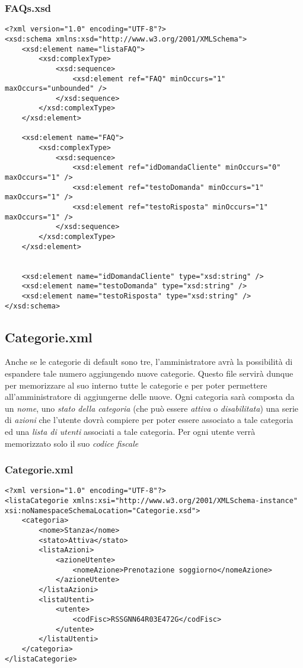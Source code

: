 \documentclass [a4paper, 12pt]{book}
\begin{document}
\subsubsection{FAQs.xsd}
\begin{lstlisting}[style=XML]
<?xml version="1.0" encoding="UTF-8"?>
<xsd:schema xmlns:xsd="http://www.w3.org/2001/XMLSchema">
    <xsd:element name="listaFAQ">
        <xsd:complexType>
            <xsd:sequence>
                <xsd:element ref="FAQ" minOccurs="1" maxOccurs="unbounded" />
            </xsd:sequence>
        </xsd:complexType>
    </xsd:element>

    <xsd:element name="FAQ">
        <xsd:complexType>
            <xsd:sequence>
                <xsd:element ref="idDomandaCliente" minOccurs="0" maxOccurs="1" />
                <xsd:element ref="testoDomanda" minOccurs="1" maxOccurs="1" />
                <xsd:element ref="testoRisposta" minOccurs="1" maxOccurs="1" />
            </xsd:sequence>
        </xsd:complexType>
    </xsd:element>


    <xsd:element name="idDomandaCliente" type="xsd:string" />
    <xsd:element name="testoDomanda" type="xsd:string" />
    <xsd:element name="testoRisposta" type="xsd:string" />
</xsd:schema>
\end{lstlisting}

\subsection{Categorie.xml}
Anche se le categorie di default sono tre, l'amministratore avrà la possibilità di espandere tale numero aggiungendo nuove categorie. Questo file servirà dunque per memorizzare al suo interno tutte le categorie e per poter permettere all'amministratore di aggiungerne delle nuove. Ogni categoria sarà composta da un \textit{nome}, uno \textit{stato della categoria} (che può essere \textit{attiva} o \textit{disabilitata}) una serie di \textit{azioni} che l'utente dovrà compiere per poter essere associato a  tale categoria ed una \textit{lista di utenti} associati a tale categoria. Per ogni utente verrà memorizzato solo il suo \textit{codice fiscale}

\subsubsection{Categorie.xml}
\begin{lstlisting}[style=XML]
<?xml version="1.0" encoding="UTF-8"?>
<listaCategorie xmlns:xsi="http://www.w3.org/2001/XMLSchema-instance" xsi:noNamespaceSchemaLocation="Categorie.xsd">
    <categoria>
        <nome>Stanza</nome>
        <stato>Attiva</stato>
        <listaAzioni>
            <azioneUtente>
                <nomeAzione>Prenotazione soggiorno</nomeAzione>
            </azioneUtente>
        </listaAzioni>        
        <listaUtenti>
            <utente>
                <codFisc>RSSGNN64R03E472G</codFisc>
            </utente>
        </listaUtenti>
    </categoria>
</listaCategorie>
\end{lstlisting}
\end{document}
